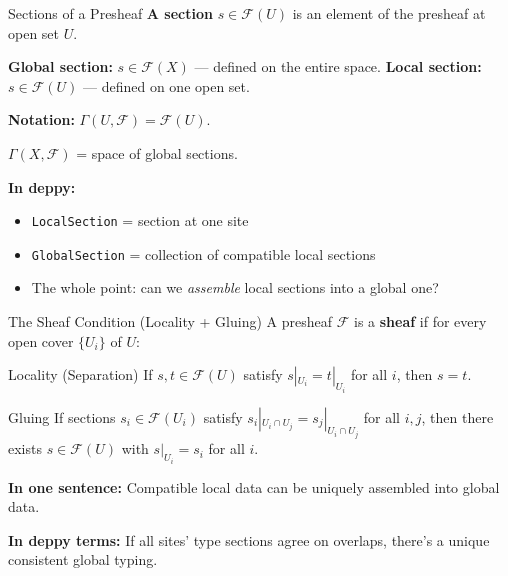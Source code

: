 \documentclass[aspectratio=169,10pt]{beamer}
\newcommand{\Fscr}{\mathcal{F}}
\begin{document}
\begin{frame}{Sections of a Presheaf}
\textbf{A section} $s \in \Fscr(U)$ is an element of the presheaf at open set $U$.

\textbf{Global section:} $s \in \Fscr(X)$ --- defined on the entire space.
\textbf{Local section:} $s \in \Fscr(U)$ --- defined on one open set.

\vspace{0.5em}
\textbf{Notation:} $\Gamma(U, \Fscr) = \Fscr(U)$.

$\Gamma(X, \Fscr)$ = space of global sections.

\vspace{0.5em}
\textbf{In deppy:}
\begin{itemize}
  \item \texttt{LocalSection} = section at one site
  \item \texttt{GlobalSection} = collection of compatible local sections
  \item The whole point: can we \emph{assemble} local sections into a global one?
\end{itemize}
\end{frame}

\begin{frame}{The Sheaf Condition (Locality + Gluing)}
A presheaf $\Fscr$ is a \textbf{sheaf} if for every open cover $\{U_i\}$ of $U$:

\begin{block}{Locality (Separation)}
If $s, t \in \Fscr(U)$ satisfy $s|_{U_i} = t|_{U_i}$ for all $i$, then $s = t$.
\end{block}

\begin{block}{Gluing}
If sections $s_i \in \Fscr(U_i)$ satisfy $s_i|_{U_i \cap U_j} = s_j|_{U_i \cap U_j}$ for all $i, j$, then there exists $s \in \Fscr(U)$ with $s|_{U_i} = s_i$ for all $i$.
\end{block}

\vspace{0.3em}
\textbf{In one sentence:} Compatible local data can be uniquely assembled into global data.

\textbf{In deppy terms:} If all sites' type sections agree on overlaps, there's a unique consistent global typing.
\end{frame}
\end{document}
